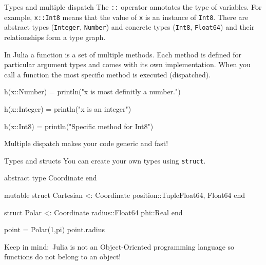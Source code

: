\documentclass{beamer}
\newenvironment{Boxx}{\begin{tcolorbox}[standard jigsaw, opacityframe=0.8, opacityback=0.0]}{\end{tcolorbox}}
\begin{document}
\begin{frame}[fragile]{Types and multiple dispatch}
	The \verb|::| operator annotates the type of variables. For example, \verb|x::Int8| means that the value of \verb|x| is an instance of \verb|Int8|. There are abstract types (\verb|Integer|, \verb|Number|) and concrete types (\verb|Int8|, \verb|Float64|) and their relationships form a type graph.
	\vspace*{5mm}
	
	In Julia a function is a set of multiple methods. Each method is defined for particular argument types and comes with its own implementation. When you call a function the most specific method is executed (dispatched).
	\begin{Boxx}
	\begin{jllisting}
  h(x::Number) = println("x is most definitly a number.")

  h(x::Integer) = println("x is an integer")
  
  h(x::Int8) = println("Specific method for Int8")
	\end{jllisting}
\end{Boxx}
Multiple dispatch makes your code generic and fast!
\end{frame}


\begin{frame}[fragile]{Types and structs}
 You can create your own types using \verb|struct|.
 \begin{Boxx}
  \begin{jllisting}
  abstract type Coordinate end
  
  mutable struct Cartesian <: Coordinate
    position::Tuple{Float64, Float64}
  end
  
  struct Polar <: Coordinate
    radius::Float64
    phi::Real
  end
  
  point = Polar(1,pi)
  point.radius
  \end{jllisting}
\end{Boxx}
Keep in mind:~Julia is not an Object-Oriented programming language so functions do not belong to an object!
\end{frame}
\end{document}
